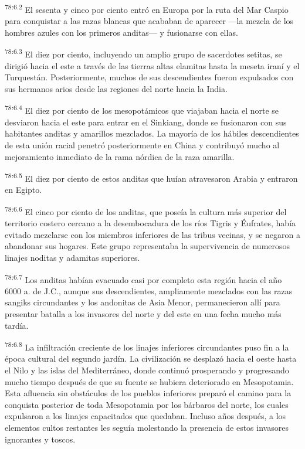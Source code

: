 \par
\textsuperscript{78:6.2} El sesenta y cinco por ciento entró en Europa por la ruta del Mar Caspio para conquistar a las razas blancas que acababan de aparecer ---la mezcla de los hombres azules con los primeros anditas--- y fusionarse con ellas.

\par
\textsuperscript{78:6.3} El diez por ciento, incluyendo un amplio grupo de sacerdotes setitas, se dirigió hacia el este a través de las tierras altas elamitas hasta la meseta iraní y el Turquestán. Posteriormente, muchos de sus descendientes fueron expulsados con sus hermanos arios desde las regiones del norte hacia la India.

\par
\textsuperscript{78:6.4} El diez por ciento de los mesopotámicos que viajaban hacia el norte se desviaron hacia el este para entrar en el Sinkiang, donde se fusionaron con sus habitantes anditas y amarillos mezclados. La mayoría de los hábiles descendientes de esta unión racial penetró posteriormente en China y contribuyó mucho al mejoramiento inmediato de la rama nórdica de la raza amarilla.

\par
\textsuperscript{78:6.5} El diez por ciento de estos anditas que huían atravesaron Arabia y entraron en Egipto.

\par
\textsuperscript{78:6.6} El cinco por ciento de los anditas, que poseía la cultura más superior del territorio costero cercano a la desembocadura de los ríos Tigris y Éufrates, había evitado mezclarse con los miembros inferiores de las tribus vecinas, y se negaron a abandonar sus hogares. Este grupo representaba la supervivencia de numerosos linajes noditas y adamitas superiores.

\par
\textsuperscript{78:6.7} Los anditas habían evacuado casi por completo esta región hacia el año 6000 a. de J.C., aunque sus descendientes, ampliamente mezclados con las razas sangiks circundantes y los andonitas de Asia Menor, permanecieron allí para presentar batalla a los invasores del norte y del este en una fecha mucho más tardía.

\par
\textsuperscript{78:6.8} La infiltración creciente de los linajes inferiores circundantes puso fin a la época cultural del segundo jardín. La civilización se desplazó hacia el oeste hasta el Nilo y las islas del Mediterráneo, donde continuó prosperando y progresando mucho tiempo después de que su fuente se hubiera deteriorado en Mesopotamia. Esta afluencia sin obstáculos de los pueblos inferiores preparó el camino para la conquista posterior de toda Mesopotamia por los bárbaros del norte, los cuales expulsaron a los linajes capacitados que quedaban. Incluso años después, a los elementos cultos restantes les seguía molestando la presencia de estos invasores ignorantes y toscos.

